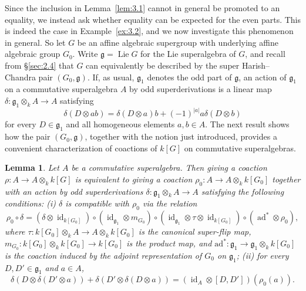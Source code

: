 \documentclass[11pt,a4paper,reqno,noamsfonts]{amsart}
\numberwithin{equation}{section}
\newtheorem{lemma}[theorem]{Lemma}
\theoremstyle{definition}
\theoremstyle{remark}
\newcommand{\gfrak}{\ensuremath{\mathfrak{g}}}
\DeclareMathOperator{\id}{id}
\DeclareMathOperator{\Lie}{Lie}
\DeclareMathOperator{\ad}{ad}
\begin{document}
Since the inclusion in Lemma~\ref{lem:3.1} cannot in general be promoted to an equality, we instead ask whether equality can be expected for the even parts. This is indeed the case in Example~\ref{ex:3.2}, and we now investigate this phenomenon in general. So let $G$ be an affine algebraic supergroup with underlying affine algebraic group $G_0$. Write $\gfrak = \Lie G$ for the Lie superalgebra of $G$, and recall from \S\ref{sec:2.4} that $G$ can equivalently be described by the super Harish--Chandra pair $(G_0,\gfrak)$. If, as usual, $\gfrak_1$ denotes the odd part of $\mathfrak{g}$, an action of $\mathfrak{g}_{1}$ on a commutative superalgebra $A$ by odd superderivations is a linear map $\delta \colon \mathfrak{g}_1 \otimes_k A \to A$ satisfying
\begin{equation}\label{eq:3.4}
\delta(D \otimes ab) = \delta(D \otimes a) b + (-1)^{\lvert a \rvert} a\delta(D \otimes b)
\end{equation}
for every $D \in \mathfrak{g}_1$ and all homogeneous elements $a, b \in A$. The next result shows how the pair $(G_0,\gfrak)$, together with the notion just introduced, provides a convenient characterization of coactions of $k[G]$ on commutative superalgebras.

\begin{lemma}\label{lem:3.3}
Let $A$ be a commutative superalgebra. Then giving a coaction $\rho \colon A \to A \otimes_k k[G]$ is equivalent to giving a coaction $\rho_0 \colon A \to A \otimes_k k[G_0]$ together with an action by odd superderivations $\delta \colon \gfrak_1 \otimes_k A \to A$ satisfying the following conditions: \emph{(i)}  $\delta$ is compatible with $\rho _{0}$ via the relation
\begin{equation}
\rho_0 \circ \delta = (\delta \otimes \id_{k[G_0]}) \circ (\id_{\gfrak_1} \otimes m_{G_0}) \circ (\id_{\gfrak_1} \otimes \tau \otimes \id_{k[G_0]}) \circ (\ad^{*} \otimes \rho_0),
\end{equation}
where $\tau \colon k[G_0] \otimes_k A \to A \otimes_k k[G_0]$ is the canonical super-flip map, $m_{G_0} \colon k[G_0] \otimes_k k[G_0] \to k[G_0]$ is the product map, and $\mathrm{ad}^* \colon \gfrak_1 \to \gfrak_1 \otimes_k k[G_0]$ is the coaction induced by the adjoint representation of $G_{0}$ on $\gfrak_{1}$; \emph{(ii)} for every $D, D' \in \gfrak_1$ and $a \in A$,
\begin{equation}\label{eq:3.6}
\delta (D \otimes \delta(D' \otimes a)) + \delta (D' \otimes \delta(D \otimes a)) = (\id_{A} \otimes [D,D'])(\rho_0 (a)).
\end{equation}
\end{lemma}
\end{document}
